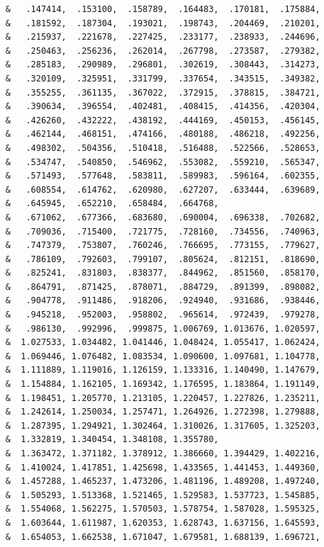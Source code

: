 \begin{lstlisting}
     &   .147414,  .153100,  .158789,  .164483,  .170181,  .175884,
     &   .181592,  .187304,  .193021,  .198743,  .204469,  .210201,
     &   .215937,  .221678,  .227425,  .233177,  .238933,  .244696,
     &   .250463,  .256236,  .262014,  .267798,  .273587,  .279382,
     &   .285183,  .290989,  .296801,  .302619,  .308443,  .314273,
     &   .320109,  .325951,  .331799,  .337654,  .343515,  .349382,
     &   .355255,  .361135,  .367022,  .372915,  .378815,  .384721,
     &   .390634,  .396554,  .402481,  .408415,  .414356,  .420304,
     &   .426260,  .432222,  .438192,  .444169,  .450153,  .456145,
     &   .462144,  .468151,  .474166,  .480188,  .486218,  .492256,
     &   .498302,  .504356,  .510418,  .516488,  .522566,  .528653,
     &   .534747,  .540850,  .546962,  .553082,  .559210,  .565347,
     &   .571493,  .577648,  .583811,  .589983,  .596164,  .602355,
     &   .608554,  .614762,  .620980,  .627207,  .633444,  .639689,
     &   .645945,  .652210,  .658484,  .664768,
     &   .671062,  .677366,  .683680,  .690004,  .696338,  .702682,
     &   .709036,  .715400,  .721775,  .728160,  .734556,  .740963,
     &   .747379,  .753807,  .760246,  .766695,  .773155,  .779627,
     &   .786109,  .792603,  .799107,  .805624,  .812151,  .818690,
     &   .825241,  .831803,  .838377,  .844962,  .851560,  .858170,
     &   .864791,  .871425,  .878071,  .884729,  .891399,  .898082,
     &   .904778,  .911486,  .918206,  .924940,  .931686,  .938446,
     &   .945218,  .952003,  .958802,  .965614,  .972439,  .979278,
     &   .986130,  .992996,  .999875, 1.006769, 1.013676, 1.020597,
     &  1.027533, 1.034482, 1.041446, 1.048424, 1.055417, 1.062424,
     &  1.069446, 1.076482, 1.083534, 1.090600, 1.097681, 1.104778,
     &  1.111889, 1.119016, 1.126159, 1.133316, 1.140490, 1.147679,
     &  1.154884, 1.162105, 1.169342, 1.176595, 1.183864, 1.191149,
     &  1.198451, 1.205770, 1.213105, 1.220457, 1.227826, 1.235211,
     &  1.242614, 1.250034, 1.257471, 1.264926, 1.272398, 1.279888,
     &  1.287395, 1.294921, 1.302464, 1.310026, 1.317605, 1.325203,
     &  1.332819, 1.340454, 1.348108, 1.355780,
     &  1.363472, 1.371182, 1.378912, 1.386660, 1.394429, 1.402216,
     &  1.410024, 1.417851, 1.425698, 1.433565, 1.441453, 1.449360,
     &  1.457288, 1.465237, 1.473206, 1.481196, 1.489208, 1.497240,
     &  1.505293, 1.513368, 1.521465, 1.529583, 1.537723, 1.545885,
     &  1.554068, 1.562275, 1.570503, 1.578754, 1.587028, 1.595325,
     &  1.603644, 1.611987, 1.620353, 1.628743, 1.637156, 1.645593,
     &  1.654053, 1.662538, 1.671047, 1.679581, 1.688139, 1.696721,

\end{lstlisting}
